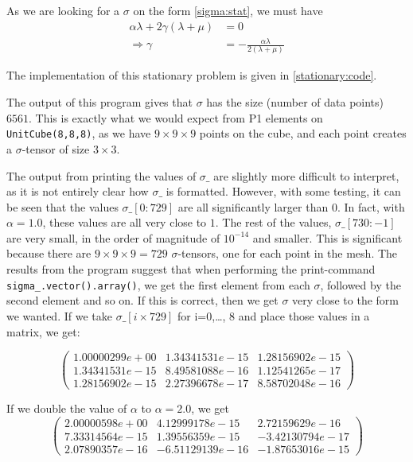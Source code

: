 \documentclass[twoside]{article}
\begin{document}
As we are looking for a $\sigma$ on the form \eqref{sigma:stat}, we must have
\begin{align}
\alpha\lambda + 2\gamma(\lambda + \mu) &= 0\\
\Rightarrow \gamma &= -\frac{\alpha\lambda}{2(\lambda + \mu)}
\end{align}

The implementation of this stationary problem is given in \ref{stationary:code}.

The output of this program gives that $\sigma$ has the size (number of data points) $6561$. This is exactly what we would expect from P1 elements on \texttt{UnitCube(8,8,8)}, as we have $9\times9\times9$ points on the cube, and each point creates a $\sigma$-tensor of size $3\times3$.

The output from printing the values of $\sigma\_$ are slightly more difficult to interpret, as it is not entirely clear how $\sigma\_$ is formatted. However, with some testing, it can be seen that the values $\sigma\_[0:729]$ are all significantly larger than 0. In fact, with $\alpha=1.0$, these values are all very close to $1$. The rest of the values, $\sigma\_[730:-1]$ are very small, in the order of magnitude of $10^{-14}$ and smaller. This is significant because there are $9\times9\times9 = 729$  $\sigma$-tensors, one for each point in the mesh. The results from the program suggest that when performing the print-command \texttt{sigma\_.vector().array()}, we get the first element from each $\sigma$, followed by the second element and so on. 
If this is correct, then we get $\sigma$ very close to the form we wanted. If we take $\sigma\_[i\times729]$ for i=0,\ldots, 8 and place those values in a matrix, we get:

\begin{equation*}
\left(\begin{matrix}
1.00000299e+00  & 1.34341531e-15 &  1.28156902e-15\\
1.34341531e-15  & 8.49581088e-16  & 1.12541265e-17\\
1.28156902e-15  & 2.27396678e-17  & 8.58702048e-16
\end{matrix}\right)
\end{equation*}

If we double the value of $\alpha$ to $\alpha = 2.0$, we get
\begin{equation*}
\left(\begin{matrix}
2.00000598e+00  & 4.12999178e-15  & 2.72159629e-16\\
7.33314564e-15  & 1.39556359e-15  & -3.42130794e-17\\
2.07890357e-16  &  -6.51129139e-16  & -1.87653016e-15
\end{matrix}\right)
\end{equation*}
\end{document}
